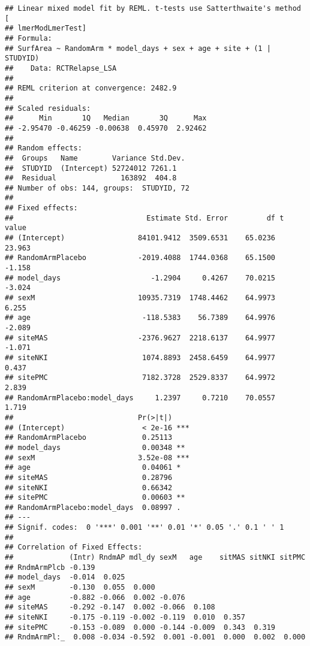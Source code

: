 \documentclass[]{article}
\theoremstyle{definition}
\theoremstyle{definition}
\theoremstyle{definition}
\theoremstyle{remark}
\begin{document}
\begin{verbatim}
## Linear mixed model fit by REML. t-tests use Satterthwaite's method [
## lmerModLmerTest]
## Formula: 
## SurfArea ~ RandomArm * model_days + sex + age + site + (1 | STUDYID)
##    Data: RCTRelapse_LSA
## 
## REML criterion at convergence: 2482.9
## 
## Scaled residuals: 
##      Min       1Q   Median       3Q      Max 
## -2.95470 -0.46259 -0.00638  0.45970  2.92462 
## 
## Random effects:
##  Groups   Name        Variance Std.Dev.
##  STUDYID  (Intercept) 52724012 7261.1  
##  Residual               163892  404.8  
## Number of obs: 144, groups:  STUDYID, 72
## 
## Fixed effects:
##                               Estimate Std. Error         df t value
## (Intercept)                 84101.9412  3509.6531    65.0236  23.963
## RandomArmPlacebo            -2019.4088  1744.0368    65.1500  -1.158
## model_days                     -1.2904     0.4267    70.0215  -3.024
## sexM                        10935.7319  1748.4462    64.9973   6.255
## age                          -118.5383    56.7389    64.9976  -2.089
## siteMAS                     -2376.9627  2218.6137    64.9977  -1.071
## siteNKI                      1074.8893  2458.6459    64.9977   0.437
## sitePMC                      7182.3728  2529.8337    64.9972   2.839
## RandomArmPlacebo:model_days     1.2397     0.7210    70.0557   1.719
##                             Pr(>|t|)    
## (Intercept)                  < 2e-16 ***
## RandomArmPlacebo             0.25113    
## model_days                   0.00348 ** 
## sexM                        3.52e-08 ***
## age                          0.04061 *  
## siteMAS                      0.28796    
## siteNKI                      0.66342    
## sitePMC                      0.00603 ** 
## RandomArmPlacebo:model_days  0.08997 .  
## ---
## Signif. codes:  0 '***' 0.001 '**' 0.01 '*' 0.05 '.' 0.1 ' ' 1
## 
## Correlation of Fixed Effects:
##             (Intr) RndmAP mdl_dy sexM   age    sitMAS sitNKI sitPMC
## RndmArmPlcb -0.139                                                 
## model_days  -0.014  0.025                                          
## sexM        -0.130  0.055  0.000                                   
## age         -0.882 -0.066  0.002 -0.076                            
## siteMAS     -0.292 -0.147  0.002 -0.066  0.108                     
## siteNKI     -0.175 -0.119 -0.002 -0.119  0.010  0.357              
## sitePMC     -0.153 -0.089  0.000 -0.144 -0.009  0.343  0.319       
## RndmArmPl:_  0.008 -0.034 -0.592  0.001 -0.001  0.000  0.002  0.000
\end{verbatim}
\end{document}
